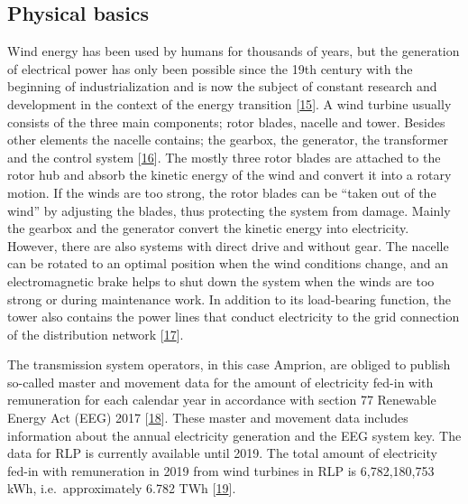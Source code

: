 \documentclass[a4paper,11pt]{article}
\begin{document}
\hypertarget{physical-basics}{%
\subsection{Physical basics}\label{physical-basics}}

Wind energy has been used by humans for thousands of years, but the generation of electrical power has only been possible since the 19th century with the beginning of industrialization and is now the subject of constant research and development in the context of the energy transition {[}\protect\hyperlink{ref-Wikipedia.2021}{15}{]}. A wind turbine usually consists of the three main components; rotor blades, nacelle and tower. Besides other elements the nacelle contains; the gearbox, the generator, the transformer and the control system {[}\protect\hyperlink{ref-MladenBosnjakovic.2013}{16}{]}. The mostly three rotor blades are attached to the rotor hub and absorb the kinetic energy of the wind and convert it into a rotary motion. If the winds are too strong, the rotor blades can be ``taken out of the wind'' by adjusting the blades, thus protecting the system from damage. Mainly the gearbox and the generator convert the kinetic energy into electricity. However, there are also systems with direct drive and without gear. The nacelle can be rotated to an optimal position when the wind conditions change, and an electromagnetic brake helps to shut down the system when the winds are too strong or during maintenance work. In addition to its load-bearing function, the tower also contains the power lines that conduct electricity to the grid connection of the distribution network {[}\protect\hyperlink{ref-NetzKonstrukteur.16.11.2020}{17}{]}.

The transmission system operators, in this case Amprion, are obliged to publish so-called master and movement data for the amount of electricity fed-in with remuneration for each calendar year in accordance with section 77 Renewable Energy Act (EEG) 2017 {[}\protect\hyperlink{ref-Bundesgestzblatt.2017}{18}{]}. These master and movement data includes information about the annual electricity generation and the EEG system key. The data for RLP is currently available until 2019. The total amount of electricity fed-in with remuneration in 2019 from wind turbines in RLP is 6,782,180,753 kWh, i.e.~approximately 6.782 TWh {[}\protect\hyperlink{ref-EnergieagenturRheinlandPfalz.2019}{19}{]}.
\end{document}
